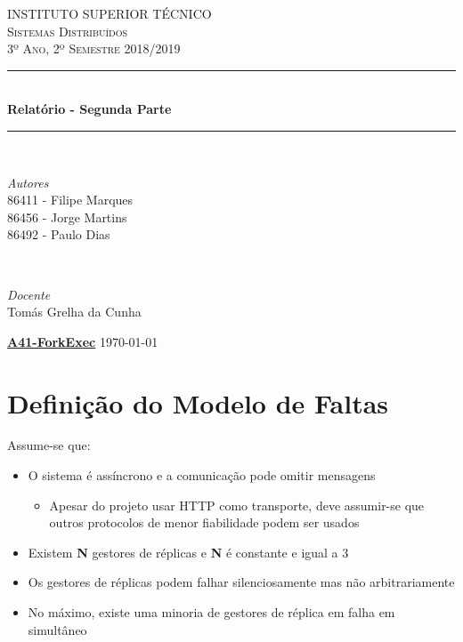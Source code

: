 \documentclass[a4paper]{article}
\begin{document}
\begin{titlepage}
	\newcommand{\HRule}{\rule{\linewidth}{0.5mm}}
	\center
	\textsc{\LARGE INSTITUTO SUPERIOR TÉCNICO}\\[1.0cm]
	\textsc{\Large Sistemas Distribuídos}\\[0.5cm]
	\textsc{\large 3º Ano, 2º Semestre 2018/2019}\\[0.2cm]
	
	\HRule\\[0.4cm]
	{\huge\bfseries Relatório - Segunda Parte}\\[0.2cm]
	\HRule\\[1.5cm]
	
	\begin{minipage}{0.4\textwidth}
		\begin{flushleft}
		\large
		\textit{Autores}\\
		86411 - Filipe Marques\\
		86456 - Jorge Martins\\
		86492 - Paulo Dias
		\end{flushleft}
	\end{minipage}
	~
	\begin{minipage}{0.4\textwidth}
		\begin{flushright}
		\large
		\textit{Docente}\\
		Tomás Grelha da Cunha
		\end{flushright}
	\end{minipage}
	
	\vfill
	\large\href{https://github.com/tecnico-distsys/A41-ForkExec}{\textbf{A41-ForkExec}}
	\vfill
	{\large\today}
	\vfill
\end{titlepage}

\begin{titlepage}

\tableofcontents
\end{titlepage}

\section{Definição do Modelo de Faltas}
Assume-se que:
\begin{itemize}
\item O sistema é assíncrono e a comunicação pode omitir mensagens
\begin{itemize}
\item Apesar do projeto usar HTTP como transporte, deve assumir-se que outros protocolos  de menor fiabilidade podem ser usados
\end{itemize}
\item Existem \textbf{N} gestores de réplicas e \textbf{N} é constante e igual a 3
\item Os gestores de réplicas podem falhar silenciosamente mas não arbitrariamente
\item No máximo, existe uma minoria de gestores de réplica em falha em simultâneo
\end{itemize}
\end{document}
